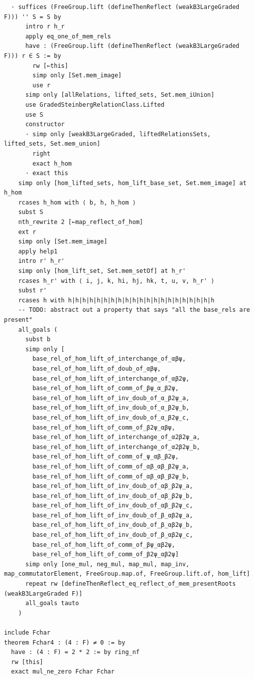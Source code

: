 \begin{Verbatim}
  · suffices (FreeGroup.lift (defineThenReflect (weakB3LargeGraded F))) '' S = S by
      intro r h_r
      apply eq_one_of_mem_rels
      have : (FreeGroup.lift (defineThenReflect (weakB3LargeGraded F))) r ∈ S := by
        rw [←this]
        simp only [Set.mem_image]
        use r
      simp only [allRelations, lifted_sets, Set.mem_iUnion]
      use GradedSteinbergRelationClass.Lifted
      use S
      constructor
      · simp only [weakB3LargeGraded, liftedRelationsSets, lifted_sets, Set.mem_union]
        right
        exact h_hom
      · exact this
    simp only [hom_lifted_sets, hom_lift_base_set, Set.mem_image] at h_hom
    rcases h_hom with ⟨ b, h, h_hom ⟩
    subst S
    nth_rewrite 2 [←map_reflect_of_hom]
    ext r
    simp only [Set.mem_image]
    apply help1
    intro r' h_r'
    simp only [hom_lift_set, Set.mem_setOf] at h_r'
    rcases h_r' with ⟨ i, j, k, hi, hj, hk, t, u, v, h_r' ⟩
    subst r'
    rcases h with h|h|h|h|h|h|h|h|h|h|h|h|h|h|h|h|h|h|h|h|h
    -- TODO: abstract out a property that says "all the base_rels are present"
    all_goals (
      subst b
      simp only [
        base_rel_of_hom_lift_of_interchange_of_αβψ,
        base_rel_of_hom_lift_of_doub_of_αβψ,
        base_rel_of_hom_lift_of_interchange_of_αβ2ψ,
        base_rel_of_hom_lift_of_comm_of_βψ_α_β2ψ,
        base_rel_of_hom_lift_of_inv_doub_of_α_β2ψ_a,
        base_rel_of_hom_lift_of_inv_doub_of_α_β2ψ_b,
        base_rel_of_hom_lift_of_inv_doub_of_α_β2ψ_c,
        base_rel_of_hom_lift_of_comm_of_β2ψ_αβψ,
        base_rel_of_hom_lift_of_interchange_of_α2β2ψ_a,
        base_rel_of_hom_lift_of_interchange_of_α2β2ψ_b,
        base_rel_of_hom_lift_of_comm_of_ψ_αβ_β2ψ,
        base_rel_of_hom_lift_of_comm_of_αβ_αβ_β2ψ_a,
        base_rel_of_hom_lift_of_comm_of_αβ_αβ_β2ψ_b,
        base_rel_of_hom_lift_of_inv_doub_of_αβ_β2ψ_a,
        base_rel_of_hom_lift_of_inv_doub_of_αβ_β2ψ_b,
        base_rel_of_hom_lift_of_inv_doub_of_αβ_β2ψ_c,
        base_rel_of_hom_lift_of_inv_doub_of_β_αβ2ψ_a,
        base_rel_of_hom_lift_of_inv_doub_of_β_αβ2ψ_b,
        base_rel_of_hom_lift_of_inv_doub_of_β_αβ2ψ_c,
        base_rel_of_hom_lift_of_comm_of_βψ_αβ2ψ,
        base_rel_of_hom_lift_of_comm_of_β2ψ_αβ2ψ]
      simp only [one_mul, neg_mul, map_mul, map_inv, map_commutatorElement, FreeGroup.map.of, FreeGroup.lift.of, hom_lift]
      repeat rw [defineThenReflect_eq_reflect_of_mem_presentRoots (weakB3LargeGraded F)]
      all_goals tauto
    )

include Fchar
theorem Fchar4 : (4 : F) ≠ 0 := by
  have : (4 : F) = 2 * 2 := by ring_nf
  rw [this]
  exact mul_ne_zero Fchar Fchar


\end{Verbatim}
